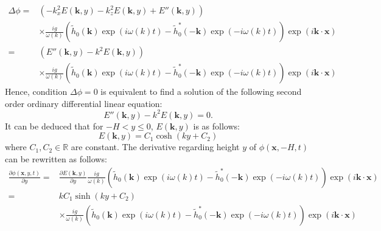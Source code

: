 \documentclass[11pt]{article}
\begin{document}
\begin{align}
	\Delta \phi\nonumber= & \left(-k_x^2 E(\mathbf{k},y) -k_z^2E(\mathbf{k},y) + E''(\mathbf{k},y)\right)\nonumber                                                                                      \\
	                      & \times \frac{ig}{\omega(k)}\left(\tilde{h}_0(\mathbf{k})\exp(i\omega(k)t)-\tilde{h}_0^*(-\mathbf{k})\exp(-i\omega(k)t)\right)
	\exp\left( i \mathbf{k}\cdot \mathbf{x}\right)\nonumber                                                                                                                                             \\
	=                     & \left(E''(\mathbf{k},y)-k^2E(\mathbf{k},y)\right) \nonumber                                                                                                                 \\
	                      & \times \frac{ig}{\omega(k)}\left(\tilde{h}_0(\mathbf{k})\exp(i\omega(k)t)-\tilde{h}_0^*(-\mathbf{k})\exp(-i\omega(k)t)\right) \exp\left(i \mathbf{k}\cdot \mathbf{x}\right)
\end{align}
Hence, condition $\Delta \phi=0$ is equivalent to find a solution of the following second order ordinary differential linear equation:
\begin{equation}
	E''(\mathbf{k}, y)-k^2E(\mathbf{k}, y) = 0.
\end{equation}
It can be deduced that for $-H<y\leq 0$, $E(\mathbf{k}, y)$ is as follows:
\begin{equation}
	E(\mathbf{k}, y)=C_1\cosh(ky+C_2)
\end{equation}
where $C_1,C_2\in\mathbb{R}$ are constant.
The derivative regarding height $y$ of $\phi(\mathbf{x},-H,t)$ can be rewritten as follows:
\begin{align*}
	\frac{\partial\phi(\mathbf{x},y,t)}{\partial y}= &
	\frac{\partial E(\mathbf{k},y)}{\partial y}\frac{ig}{\omega(k)}\left(\tilde{h}_0(\mathbf{k})\exp(i\omega(k)t)-\tilde{h}_0^*(-\mathbf{k})\exp(-i\omega(k)t)\right)\exp\left(i\mathbf{k}\cdot\mathbf x\right)               \\
	=                                                & kC_1\sinh(ky+C_2)                                                                                                                                                      \\
	                                                 & \times\frac{ig}{\omega(k)}\left(\tilde{h}_0(\mathbf{k})\exp(i\omega(k)t)-\tilde{h}_0^*(-\mathbf{k})\exp(-i\omega(k)t)\right)\exp\left(i\mathbf{k}\cdot\mathbf x\right)
\end{align*}
\end{document}
